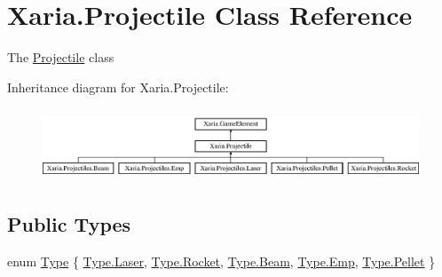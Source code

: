 \hypertarget{classXaria_1_1Projectile}{}\section{Xaria.\+Projectile Class Reference}
\label{classXaria_1_1Projectile}


The \hyperlink{classXaria_1_1Projectile}{Projectile} class  


Inheritance diagram for Xaria.\+Projectile\+:\begin{figure}[H]
\begin{center}
\leavevmode
\includegraphics[height=2.153846cm]{classXaria_1_1Projectile}
\end{center}
\end{figure}
\subsection*{Public Types}
\begin{DoxyCompactItemize}
\item 
enum \hyperlink{classXaria_1_1Projectile_a2f223d18f3b68ae549d974125826b78d}{Type} \{ \newline
\hyperlink{classXaria_1_1Projectile_a2f223d18f3b68ae549d974125826b78dad47bda86cb76322c22950e84e9cd109d}{Type.\+Laser}, 
\hyperlink{classXaria_1_1Projectile_a2f223d18f3b68ae549d974125826b78da15e8bfff2c10ca22da244d85b2bf7d94}{Type.\+Rocket}, 
\hyperlink{classXaria_1_1Projectile_a2f223d18f3b68ae549d974125826b78dadc6e84a67852dd96c1ba57da273b26ac}{Type.\+Beam}, 
\hyperlink{classXaria_1_1Projectile_a2f223d18f3b68ae549d974125826b78da30fda405a39a1754550e87835c669fbb}{Type.\+Emp}, 
\newline
\hyperlink{classXaria_1_1Projectile_a2f223d18f3b68ae549d974125826b78da65df26d4bf6ba8ce4b2c6e2a1b524d12}{Type.\+Pellet}
 \}
\end{DoxyCompactItemize}
